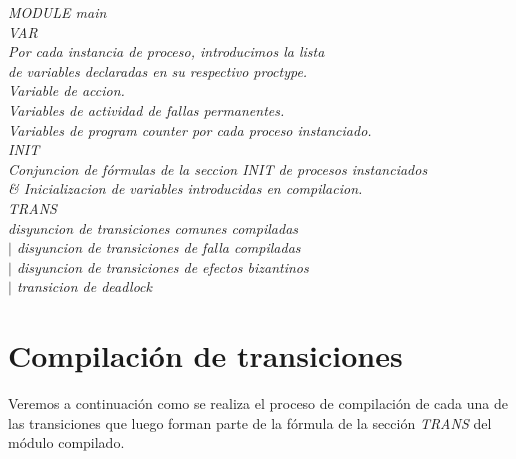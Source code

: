 \documentclass[titlepage, 12pt]{book}
\begin{document}
\noindent \textit{MODULE main\\
VAR\\
\indent    * Por cada instancia de proceso, introducimos la lista \\
\indent      de variables declaradas en su respectivo proctype.\\
\indent    * Variable de accion.\\
\indent    * Variables de actividad de fallas permanentes.\\
\indent    * Variables de program counter por cada proceso instanciado.\\
INIT\\
\indent    Conjuncion de f\'ormulas de la seccion INIT de procesos instanciados\\
\indent    \& Inicializacion de variables introducidas en compilacion.\\
TRANS\\
\indent    disyuncion de transiciones comunes compiladas \\
\indent    $|$ disyuncion de transiciones de falla compiladas\\ 
\indent    $|$ disyuncion de transiciones de efectos bizantinos\\ 
\indent    $|$ transicion de deadlock
}

\section{Compilaci\'on de transiciones}
Veremos a continuaci\'on como se realiza el proceso de compilaci\'on de cada una de las transiciones que luego forman parte de la f\'ormula de la secci\'on \textit{TRANS} del m\'odulo compilado.
\end{document}
